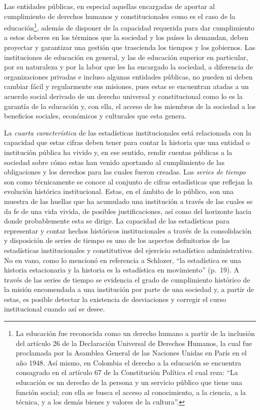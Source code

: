 \documentclass[
]{book}
\begin{document}
Las entidades públicas, en especial aquellas encargadas de aportar al cumplimiento de derechos humanos y constitucionales como es el caso de la educación\footnote{La educación fue reconocida como un derecho humano a partir de la inclusión del artículo 26 de la Declaración Universal de Derechos Humanos, la cual fue proclamada por la Asamblea General de las Naciones Unidas en París en el año 1948. Así mismo, en Colombia el derecho a la educación se encuentra consagrado en el artículo 67 de la Constitución Política el cual reza: ``La educación es un derecho de la persona y un servicio público que tiene una función social; con ella se busca el acceso al conocimiento, a la ciencia, a la técnica, y a los demás bienes y valores de la cultura''.}, además de disponer de la capacidad requerida para dar cumplimiento a estos deberes en los términos que la sociedad y los países lo demandan, deben proyectar y garantizar una gestión que trascienda los tiempos y los gobiernos. Las instituciones de educación en general, y las de educación superior en particular, por su naturaleza y por la labor que les ha encargado la sociedad, a diferencia de organizaciones privadas e incluso algunas entidades públicas, no pueden ni deben cambiar fácil y regularmente sus misiones, pues estas se encuentran atadas a un acuerdo social derivado de un derecho universal y constitucional como lo es la garantía de la educación y, con ella, el acceso de los miembros de la sociedad a los beneficios sociales, económicos y culturales que esta genera.

La \emph{cuarta característica} de las estadísticas institucionales está relacionada con la capacidad que estas cifras deben tener para contar la historia que una entidad o institución pública ha vivido y, en ese sentido, rendir cuentas públicas a la sociedad sobre cómo estas han venido aportando al cumplimiento de las obligaciones y los derechos para las cuales fueron creadas. Las \emph{series de tiempo} son como técnicamente se conoce al conjunto de cifras estadísticas que reflejan la evolución histórica institucional. Estas, en el ámbito de lo público, son una muestra de las huellas que ha acumulado una institución a través de las cuales se da fe de una vida vivida, de posibles justificaciones, así como del horizonte hacia donde probablemente esta se dirige. La capacidad de las estadísticas para representar y contar hechos históricos institucionales a través de la consolidación y disposición de series de tiempo es uno de los aspectos definitorios de las estadísticas institucionales y constitutivos del ejercicio estadístico administrativo. No en vano, como lo mencionó \citet{rodriguez} en referencia a Schlozer, ``la estadística es una historia estacionaria y la historia es la estadística en movimiento'' (p.~19). A través de las series de tiempo se evidencia el grado de cumplimiento histórico de la misión encomendada a una institución por parte de una sociedad y, a partir de estas, es posible detectar la existencia de desviaciones y corregir el curso institucional cuando así se desee.
\end{document}
